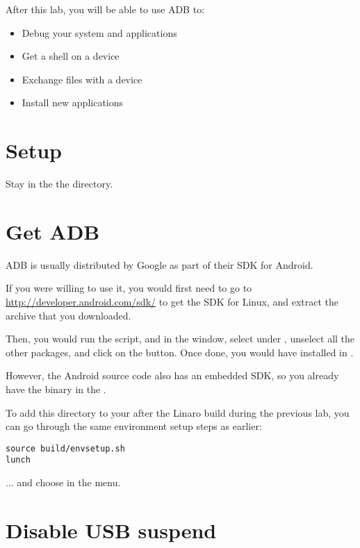 
After this lab, you will be able to use ADB to:
\begin{itemize}
  \item Debug your system and applications
  \item Get a shell on a device
  \item Exchange files with a device
  \item Install new applications
\end{itemize}

\section{Setup}

Stay in the the  directory.

\section{Get ADB}

ADB is usually distributed by Google as part of their SDK for Android.

If you were willing to use it, you would first need to go to
\url{http://developer.android.com/sdk/} to get the SDK for Linux, and
extract the archive that you downloaded.

Then, you would run the  script, and in the
 window, select  under
, unselect all the other packages, and click on the
 button.  Once done, you would have
 installed in .

However, the Android source code also has an embedded SDK, so you
already have the  binary in the
.

To add this directory to your  after the Linaro build
during the previous lab, you can go through the same environment setup
steps as earlier:

\begin{verbatim}
source build/envsetup.sh
lunch
\end{verbatim}

... and choose  in the  menu.

\section{Disable USB suspend}

